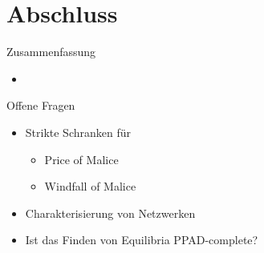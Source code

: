 \documentclass{beamer}
\begin{document}
%				
%				
%				
%				
%			
%			
%	


\section{Abschluss}
\begin{frame}{Zusammenfassung}
	\begin{itemize}
		\item 
	\end{itemize}
\end{frame}

\begin{frame}{Offene Fragen}
	\begin{itemize}
		\item Strikte Schranken für 
		\begin{itemize}
			\item Price of Malice
			\item Windfall of Malice
		\end{itemize}
		\item Charakterisierung von Netzwerken
		\item Ist das Finden von Equilibria PPAD-complete?
	\end{itemize}
\end{frame}
\end{document}
